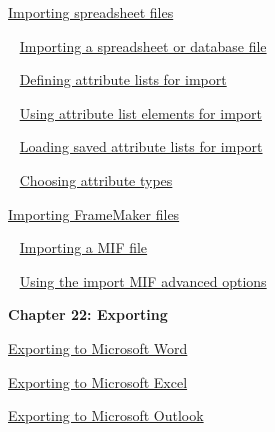 \documentclass[11pt,a4paper]{article}
\begin{document}
\href{https://www.ibm.com/support/knowledgecenter/search/Importing%20spreadsheet%20files?scope=SSYQBZ_9.6.1}{Importing spreadsheet files}

\,\,\, \href{https://www.ibm.com/support/knowledgecenter/search/Importing%20a%20spreadsheet%20or%20database%20file?scope=SSYQBZ_9.6.1}{Importing a spreadsheet or database file}

\,\,\, \href{https://www.ibm.com/support/knowledgecenter/search/Defining%20attribute%20lists%20for%20import?scope=SSYQBZ_9.6.1}{Defining attribute lists for import}

\,\,\, \href{https://www.ibm.com/support/knowledgecenter/search/Using%20attribute%20list%20elements%20for%20import?scope=SSYQBZ_9.6.1}{Using attribute list elements for import}

\,\,\, \href{https://www.ibm.com/support/knowledgecenter/search/Loading%20saved%20attribute%20lists%20for%20import?scope=SSYQBZ_9.6.1}{Loading saved attribute lists for import}

\,\,\, \href{https://www.ibm.com/support/knowledgecenter/search/Choosing%20attribute%20types?scope=SSYQBZ_9.6.1}{Choosing attribute types}

\href{https://www.ibm.com/support/knowledgecenter/search/Importing%20FrameMaker%20files?scope=SSYQBZ_9.6.1}{Importing FrameMaker files}

\,\,\, \href{https://www.ibm.com/support/knowledgecenter/search/Importing%20a%20MIF%20file?scope=SSYQBZ_9.6.1}{Importing a MIF file}

\,\,\, \href{https://www.ibm.com/support/knowledgecenter/search/Using%20the%20import%20MIF%20advanced%20options?scope=SSYQBZ_9.6.1}{Using the import MIF advanced options} \\



\begin{Large}\textbf{Chapter 22: Exporting} \end{Large} 
\vspace{1mm}

\href{https://www.ibm.com/support/knowledgecenter/search/Exporting%20to%20Microsoft%20Word?scope=SSYQBZ_9.6.1}{Exporting to Microsoft Word}

\href{https://www.ibm.com/support/knowledgecenter/search/Exporting%20to%20Microsoft%20Excel?scope=SSYQBZ_9.6.1}{Exporting to Microsoft Excel}

\href{https://www.ibm.com/support/knowledgecenter/search/Exporting%20to%20Microsoft%20Outlook?scope=SSYQBZ_9.6.1}{Exporting to Microsoft Outlook}
\end{document}
